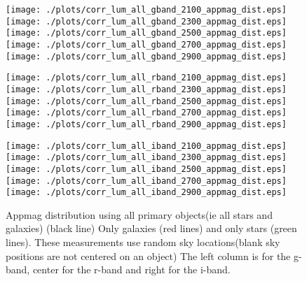 \documentclass[10pt]{article}
\begin{document}
\begin{figure}
\centering
\begin{minipage}{0.32\textwidth}
 \texttt{[image: ./plots/corr\_lum\_all\_gband\_2100\_appmag\_dist.eps]}
 \texttt{[image: ./plots/corr\_lum\_all\_gband\_2300\_appmag\_dist.eps]}
 \texttt{[image: ./plots/corr\_lum\_all\_gband\_2500\_appmag\_dist.eps]}
 \texttt{[image: ./plots/corr\_lum\_all\_gband\_2700\_appmag\_dist.eps]}
 \texttt{[image: ./plots/corr\_lum\_all\_gband\_2900\_appmag\_dist.eps]}
\end{minipage}
 \begin{minipage}{0.32\textwidth}
 \texttt{[image: ./plots/corr\_lum\_all\_rband\_2100\_appmag\_dist.eps]}
 \texttt{[image: ./plots/corr\_lum\_all\_rband\_2300\_appmag\_dist.eps]}
 \texttt{[image: ./plots/corr\_lum\_all\_rband\_2500\_appmag\_dist.eps]}
 \texttt{[image: ./plots/corr\_lum\_all\_rband\_2700\_appmag\_dist.eps]}
 \texttt{[image: ./plots/corr\_lum\_all\_rband\_2900\_appmag\_dist.eps]}
\end{minipage}
\begin{minipage}{0.32\textwidth}
 \texttt{[image: ./plots/corr\_lum\_all\_iband\_2100\_appmag\_dist.eps]}
 \texttt{[image: ./plots/corr\_lum\_all\_iband\_2300\_appmag\_dist.eps]}
 \texttt{[image: ./plots/corr\_lum\_all\_iband\_2500\_appmag\_dist.eps]}
 \texttt{[image: ./plots/corr\_lum\_all\_iband\_2700\_appmag\_dist.eps]}
 \texttt{[image: ./plots/corr\_lum\_all\_iband\_2900\_appmag\_dist.eps]}
\end{minipage}
\caption{Appmag distribution using all primary objects(ie all stars and galaxies) (black line) 
Only galaxies (red lines) and only stars (green lines).
These measurements use random sky locations(blank sky positions are not centered on an object)
The left column is for the g-band, center for the r-band and right for the i-band.
}
\end{figure}
\end{document}
